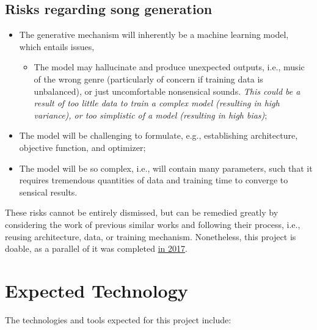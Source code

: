 \documentclass{article}
\begin{document}
\subsection{Risks regarding song generation}
\begin{itemize}
  \item The generative mechanism will inherently be a machine learning model, which entails issues,
  \begin{itemize}
    \item The model may hallucinate and produce unexpected outputs, i.e., music of the wrong genre (particularly of concern if training data is unbalanced), or just uncomfortable nonsensical sounds. \emph{This could be a result of too little data to train a complex model (resulting in high variance), or too simplistic of a model (resulting in high bias)};
  \end{itemize}
  \item The model will be challenging to formulate, e.g., establishing architecture, objective function, and optimizer;
  \item The model will be so complex, i.e., will contain many parameters, such that it requires tremendous quantities of data and training time to converge to sensical results.
\end{itemize}
These risks cannot be entirely dismissed, but can be remedied greatly by considering the work of previous similar works and following their process, i.e., reusing architecture, data, or training mechanism. Nonetheless, this project is doable, as a parallel of it was completed \href{https://www.reddit.com/r/MachineLearning/comments/6476kj/projectmusic_generated_using_my_rnn_some_bach/}{in 2017}.

\section{Expected Technology}

The technologies and tools expected for this project include:
\end{document}
